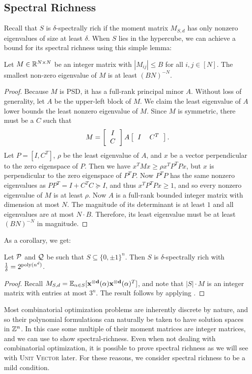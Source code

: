 \subsection{Spectral Richness}
Recall that $S$ is $\delta$-spectrally rich if the moment matrix $M_{S,d}$ has only nonzero eigenvalues of size at least $\delta$. When $S$ lies in the hypercube, we can achieve a bound for its spectral richness using this simple lemma:
\begin{lemma} \label{lem:integer}
	Let $M \in \mathbb R^{N \times N}$ be an integer matrix with $|M_{ij}| \leq B$ for all $i,j \in [N]$.  The smallest non-zero eigenvalue of $M$ is at least 
	$(BN)^{-N}$.
\end{lemma}
\begin{proof}
Because $M$ is PSD, it has a full-rank principal minor $A$. Without loss of generality, let $A$ be the upper-left block of $M$. We claim the least eigenvalue of $A$ lower bounds the least nonzero eigenvalue of $M$.
%
Since $M$ is symmetric, there must be a $C$ such that
\[M = \left[\begin{tabular}{c} $I$ \\ $C$\end{tabular}\right]A\left[\begin{tabular}{cc} $I$ & $C^T$\end{tabular}\right].\]
Let $P = [I, C^T]$, $\rho$ be the least eigenvalue of $A$, and $x$ be a vector perpendicular to the zero eigenspace of $P$. Then we have $x^TMx \geq \rho x^TP^TPx$,
but $x$ is perpendicular to the zero eigenspace of $P^TP$. Now $P^TP$ has the same nonzero eigenvalues as $PP^T = I + C^TC \succeq I$, and thus $x^TP^TPx \geq 1$, and so every nonzero eigenvalue of $M$ is at least $\rho$. Now $A$ is a full-rank bounded integer matrix with dimension at most $N$. The magnitude of its determinant is at least $1$ and all eigenvalues are at most $N \cdot B$.  Therefore, its least eigenvalue must be at least $(BN)^{-N}$ in magnitude. 
\end{proof}
As a corollary, we get:
\begin{corollary}\label{cor:integer-rich}
Let $\mathcal P$ and $\mathcal Q$ be such that $S \subseteq \{0,\pm 1\}^n$. Then $S$ is $\delta$-spectrally rich with $\frac{1}{\delta} = 2^{\operatorname{poly}(n^d)}$.
\end{corollary}
\begin{proof}
	Recall $M_{S,d} = \operatorname*{\mathbb{E}}_{\alpha \in S}[\mathbf{x^{\otimes d}}(\alpha)\mathbf{x^{\otimes d}}(\alpha)^T]$, and note that $|S| \cdot M$ is an integer matrix with entries at most $3^n$.  The result follows by applying . 
\end{proof}
Most combinatorial optimization problems are inherently discrete by nature, and so their polynomial formulations can naturally be taken to have solution spaces in $\mathbb Z^n$. In this case some multiple of their moment matrices are integer matrices, and we can use  to show spectral-richness. Even when not dealing with combinatorial optimization, it is possible to prove spectral richness as we will see with \textsc{Unit Vector} later. For these reasons, we consider spectral richness to be a mild condition.

